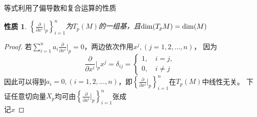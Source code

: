 \documentclass{article}
\newtheorem{proposition}{性质}
\begin{document}
等式利用了偏导数和复合运算的性质
\begin{proposition}
    $\left\{\frac{\partial}{\partial x^i}|_{p}\right\}_{i=1}^{n}$为$T_p(M)$的一组基，且${\rm dim}(T_pM)={\rm dim}(M)$
\end{proposition}
\begin{proof}
    若$\sum_{i = 1}^{n}a_i \frac{\partial}{\partial x^i}|_{p}=0$，两边依次作用$x^j,(j=1,2,...,n)$，
    因为
    $$
    \frac{\partial}{\partial x^i}|_{p}x^j=\delta_{ij}=\begin{cases}
        1,\quad i=j,\\
        0,\quad i \neq j
    \end{cases}
    $$
    因此可以得到$a_i=0,(i=1,2,...,n)$，即$\left\{\frac{\partial}{\partial x^i}|_{p}\right\}_{i=1}^{n}$在$T_p(M)$中线性无关。
    下证任意切向量$X_{p}$均可由$\left\{\frac{\partial}{\partial x^i}|_{p}\right\}_{i=1}^{n}$张成\\
    记$x$
\end{proof}
\end{document}
